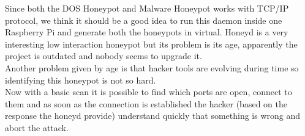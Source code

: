 Since both the DOS Honeypot and Malware Honeypot works with TCP/IP protocol, we think it should be a good idea to run this daemon inside one Raspberry Pi and generate both the honeypots in virtual.
Honeyd is a very interesting low interaction honeypot but its problem is its age, apparently the project is outdated and nobody seems to upgrade it.\\
Another problem given by age is that hacker tools are evolving during time so identifying this honeypot is not so hard.\\
Now with a basic scan it is possible to find which ports are open, connect to them and as soon as the connection is established the hacker (based on the response the honeyd provide) understand quickly that something is wrong and abort the attack.

